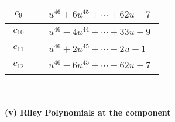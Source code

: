 \documentclass[1p]{elsarticle_modified}
\theoremstyle{definition}
\begin{document}
\begin{tabular}{m{50pt}|m{274pt}}
\hline $$\begin{aligned}c_{9}\end{aligned}$$&$\begin{aligned}
&u^{46}+6 u^{45}+\cdots+62 u+7
\end{aligned}$\\
\hline $$\begin{aligned}c_{10}\end{aligned}$$&$\begin{aligned}
&u^{46}-4 u^{44}+\cdots+33 u-9
\end{aligned}$\\
\hline $$\begin{aligned}c_{11}\end{aligned}$$&$\begin{aligned}
&u^{46}+2 u^{45}+\cdots-2 u-1
\end{aligned}$\\
\hline $$\begin{aligned}c_{12}\end{aligned}$$&$\begin{aligned}
&u^{46}-6 u^{45}+\cdots-62 u+7
\end{aligned}$\\
\hline
\end{tabular}\\~\\
\newpage\renewcommand{\arraystretch}{1}
\flushleft \textbf{(v) Riley Polynomials at the component}\newline \\
\end{document}
